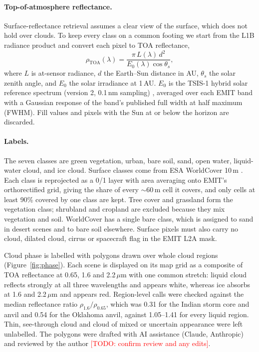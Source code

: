 \documentclass[11pt]{article}
\newcommand{\todo}[1]{\textnormal{\textcolor{red}{[TODO: #1]}}}
\newcommand{\um}{\,\ensuremath{\mu}m}
\newcommand{\nm}{\,nm}
\begin{document}
\paragraph{Top-of-atmosphere reflectance.} Surface-reflectance retrieval
assumes a clear view of the surface, which does not hold over clouds. To keep
every class on a common footing we start from the L1B radiance product and
convert each pixel to TOA reflectance,
\begin{equation}
  \rho_\mathrm{TOA}(\lambda) = \frac{\pi\, L(\lambda)\, d^2}{E_0(\lambda)\cos\theta_s},
  \label{eq:toa}
\end{equation}
where $L$ is at-sensor radiance, $d$ the Earth--Sun distance in AU,
$\theta_s$ the solar zenith angle, and $E_0$ the solar irradiance at 1\,AU.
$E_0$ is the TSIS-1 hybrid solar reference spectrum (version 2, 0.1\nm{}
sampling) \citep{coddington2021},
averaged over each EMIT band with a Gaussian response of the band's published
full width at half maximum (FWHM). Fill values and pixels with the Sun at or
below the horizon are discarded.

\paragraph{Labels.}\label{sec:labels} The seven classes are green vegetation, urban, bare
soil, sand, open water, liquid-water cloud, and ice cloud. Surface classes come
from ESA WorldCover 10\,m \citep{zanaga2022}. Each class is reprojected as a
0/1 layer with area averaging onto EMIT's orthorectified grid, giving the share
of every $\sim$60\,m cell it covers, and only cells at least 90\% covered by
one class are kept. Tree cover and grassland form the vegetation class;
shrubland and cropland are excluded because they mix vegetation and soil.
WorldCover has a single bare class, which is assigned to sand in desert scenes
and to bare soil elsewhere. Surface pixels must also carry no cloud, dilated
cloud, cirrus or spacecraft flag in the EMIT L2A mask.

Cloud phase is labelled with polygons drawn over whole cloud regions
(Figure~\ref{fig:phase}). Each scene is displayed on its map grid as a
composite of TOA reflectance at 0.65, 1.6 and 2.2\um{} with one common
stretch: liquid cloud reflects strongly at all three wavelengths and appears
white, whereas ice absorbs at 1.6 and 2.2\um{} and appears red. Region-level
calls were checked against the median reflectance ratio
$\rho_{1.6}/\rho_{0.65}$, which was 0.31 for the Indian storm core and anvil
and 0.54 for the Oklahoma anvil, against 1.05--1.41 for every liquid region.
Thin, see-through cloud and cloud of mixed or uncertain appearance were left
unlabelled. The polygons were drafted with AI assistance (Claude, Anthropic) and
reviewed by the author \todo{confirm review and any edits}.
\end{document}
